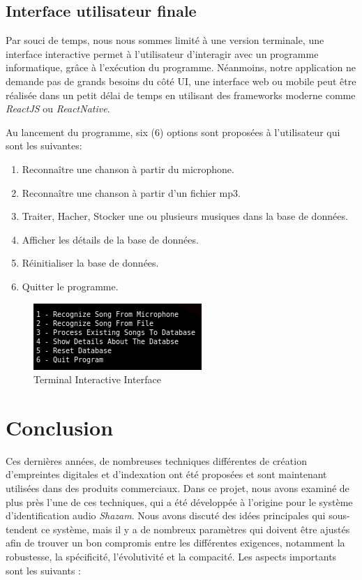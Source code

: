 \documentclass[10pt, english]{report}
\begin{document}
\section{Interface utilisateur finale}
Par souci de temps, nous nous sommes limité à une version terminale, une interface interactive permet à l'utilisateur d'interagir avec un programme informatique, grâce à l'exécution du programme. Néanmoins, notre application ne demande pas de grands besoins du côté UI, une interface web ou mobile peut être réalisée dans un petit délai de temps en utilisant des frameworks moderne comme \textit{ReactJS} ou \textit{ReactNative}.\\\par
Au lancement du programme, six (6) options sont proposées à l'utilisateur qui sont les suivantes:\\

\begin{enumerate}
	\item Reconnaître une chanson à partir du microphone.
	\item Reconnaître une chanson à partir d’un fichier mp3.
	\item Traiter, Hacher, Stocker une ou plusieurs musiques dans la base de données.
	\item Afficher les détails de la base de données.
	\item Réinitialiser la base de données.
	\item Quitter le programme.
\end{enumerate}

\begin{figure}[H]
	\centering
	\includegraphics[scale=0.8]{img/options.png}
	\caption{Terminal Interactive Interface}
\end{figure}


\chapter{Conclusion}
Ces dernières années, de nombreuses techniques différentes de création d'empreintes digitales et d'indexation ont été proposées et sont maintenant utilisées dans des produits commerciaux. Dans ce projet, nous avons examiné de plus près l'une de ces techniques, qui a été développée à l'origine pour le système d'identification audio \textit{Shazam}. Nous avons discuté des idées principales qui sous-tendent ce système, mais il y a de nombreux paramètres qui doivent être ajustés afin de trouver un bon compromis entre les différentes exigences, notamment la robustesse, la spécificité, l'évolutivité et la compacité. Les aspects importants sont les suivants :\\
\end{document}
